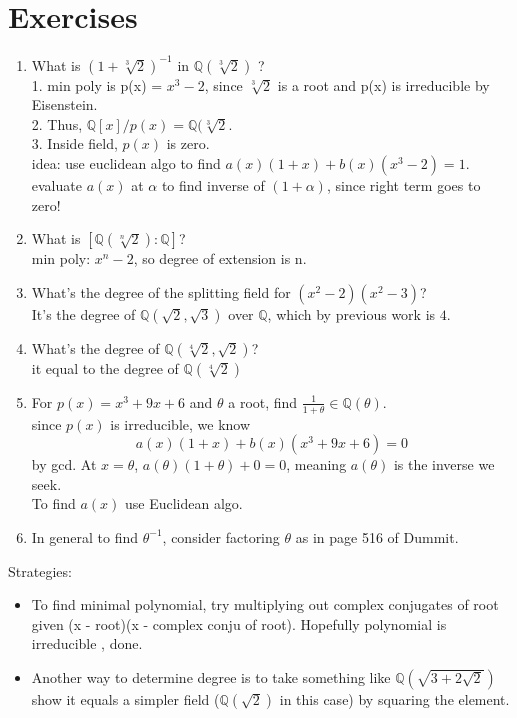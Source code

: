 \documentclass[12pt]{article}
\def\Q{\ensuremath{\mathbb{Q}}}
\newcommand{\gray}[1]{\textcolor[gray]{0.5}{#1}} %
\begin{document}
\section*{Exercises}
\begin{enumerate}
    \item What is $(1 + \sqrt[3]{2})^{-1}$ in $\Q(\sqrt[3]{2})$ ? \\
    \gray{1. min poly is p(x) = $x^3 - 2$, since $\sqrt[3]{2}$ is a root and p(x) is irreducible by Eisenstein. \\
    2. Thus, $\Q[x] / p(x) = \Q(\sqrt[3]{2}$. \\
    3. Inside field, $p(x)$ is zero.\\
    idea: use euclidean algo to find $a(x) (1+x) + b(x)(x^3-2) = 1$.\\
    evaluate $a(x)$ at $\alpha$ to find inverse of $(1+ \alpha)$, since right term goes to zero!}

    \item What is $[\Q(\sqrt[n]{2}) : \Q]$?\\
    \gray{min poly: $x^n-2$, so degree of extension is n.}

    \item What's the degree of the splitting field for $(x^2 -2)(x^2-3)$?\\
    \gray{It's the degree of $\Q(\sqrt{2}, \sqrt{3})$ over $\Q$, which by previous work is $4$.}

    \item What's the degree of $\Q(\sqrt[4]{2}, \sqrt{2})$? \\
    \gray{it equal to the degree of $\Q(\sqrt[4]{2})$}

    \item For $p(x) = x^3 + 9x + 6$ and $\theta$ a root, find $\frac{1}{1+\theta} \in \Q(\theta)$.\\
    \gray{since $p(x)$ is irreducible, we know 
    $$a(x) (1+x) + b(x)(x^3+9x+6) = 0$$
    by gcd. At $x = \theta$, $a(\theta)(1+\theta) + 0 = 0$, meaning $a(\theta)$ is the inverse we seek. \\
    To find $a(x)$ use Euclidean algo.}

    \item In general to find $\theta^{-1}$, consider factoring $\theta$ as in page 516 of Dummit.
\end{enumerate}

Strategies:
\begin{itemize}
    \item To find minimal polynomial, try multiplying out complex conjugates of root given (x - root)(x - complex conju of root). Hopefully polynomial is irreducible , done.
    \item Another way to determine degree is to take something like $\Q(\sqrt{3+2\sqrt{2}})$ show it equals a simpler field ($\Q(\sqrt{2})$ in this case) by squaring the element.
\end{itemize}
\end{document}
